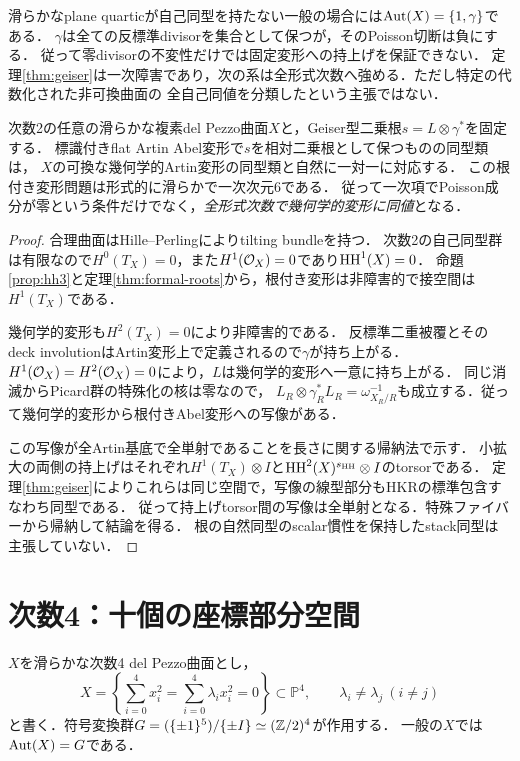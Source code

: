 \begin{remark}
滑らかなplane quarticが自己同型を持たない一般の場合には$\operatorname{Aut}(X)=\{1,\gamma\}$である\cite{DM}．
$\gamma$は全ての反標準divisorを集合として保つが，そのPoisson切断は負にする．
従って零divisorの不変性だけでは固定変形への持上げを保証できない．
定理\ref{thm:geiser}は一次障害であり，次の系は全形式次数へ強める．ただし特定の代数化された非可換曲面の
全自己同値を分類したという主張ではない．
\end{remark}

\begin{corollary}[Geiser根を保つ全形式変形は可換]\label{cor:geiser-formal}
次数2の任意の滑らかな複素del Pezzo曲面$X$と，Geiser型二乗根$s=L\otimes\gamma^*$を固定する．
標識付きflat Artin Abel変形で$s$を相対二乗根として保つものの同型類は，
$X$の可換な幾何学的Artin変形の同型類と自然に一対一に対応する．
この根付き変形問題は形式的に滑らかで一次次元6である．
従って一次項でPoisson成分が零という条件だけでなく，\emph{全形式次数で幾何学的変形に同値}となる．
\end{corollary}
\begin{proof}
合理曲面はHille--Perling\cite[Theorem 1.1]{HP}によりtilting bundleを持つ．
次数2の自己同型群は有限なので$H^0(T_X)=0$，また$H^1(\mathcal O_X)=0$であり$\operatorname{HH}^1(X)=0$．
命題\ref{prop:hh3}と定理\ref{thm:formal-roots}から，根付き変形は非障害的で接空間は$H^1(T_X)$である．

幾何学的変形も$H^2(T_X)=0$により非障害的である．
反標準二重被覆とそのdeck involutionはArtin変形上で定義されるので$\gamma$が持ち上がる．
$H^1(\mathcal O_X)=H^2(\mathcal O_X)=0$により，$L$は幾何学的変形へ一意に持ち上がる．
同じ消滅からPicard群の特殊化の核は零なので，
$L_R\otimes\gamma_R^*L_R=\omega_{X_R/R}^{-1}$も成立する．従って幾何学的変形から根付きAbel変形への写像がある．

この写像が全Artin基底で全単射であることを長さに関する帰納法で示す．
小拡大の両側の持上げはそれぞれ$H^1(T_X)\otimes I$と$\operatorname{HH}^2(X)^{s_{\operatorname{HH}}}\otimes I$のtorsorである．
定理\ref{thm:geiser}によりこれらは同じ空間で，写像の線型部分もHKRの標準包含すなわち同型である．
従って持上げtorsor間の写像は全単射となる．特殊ファイバーから帰納して結論を得る．
根の自然同型のscalar慣性を保持したstack同型は主張していない．
\end{proof}

\section{次数4：十個の座標部分空間}
\label{sec:degree4}
$X$を滑らかな次数4 del Pezzo曲面とし，
\begin{equation}\label{eq:diagonal}
 X=\left\{\sum_{i=0}^4x_i^2=\sum_{i=0}^4\lambda_i x_i^2=0\right\}\subset\mathbb P^4,
 \qquad \lambda_i\ne\lambda_j\ (i\ne j)
\end{equation}
と書く．符号変換群$G=(\{\pm1\}^5)/\{\pm I\}\simeq(\mathbb Z/2)^4$が作用する．
一般の$X$では$\operatorname{Aut}(X)=G$である\cite[Introduction, \S2]{HKT}．

